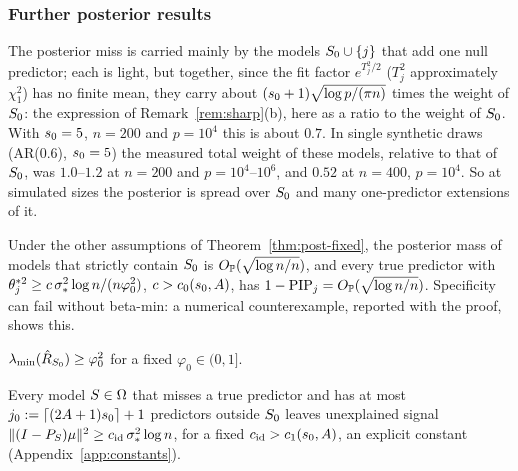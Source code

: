 \subsubsection{Further posterior results}

\begin{remark}\label{rem:moderate-n}
The posterior miss is carried mainly by the models
$S_0\cup\{j\}$ that add one null predictor; each is light, but together, since the fit factor $e^{T_j^2/2}$ ($T_j^2$
approximately $\chi^2_1$) has no finite mean, they carry about $(s_0+1)\sqrt{\log p/(\pi n)}$ times the weight of $S_0$:
the expression of Remark~\ref{rem:sharp}(b), here as a ratio to the weight of $S_0$. With $s_0=5$, $n=200$ and $p=10^4$ this is about $0.7$. In single
synthetic draws (AR(0.6), $s_0=5$) the measured total weight of these models, relative to that of $S_0$, was $1.0$--$1.2$
at $n=200$ and $p=10^4$--$10^6$, and $0.52$ at $n=400$, $p=10^4$. So at simulated sizes the posterior is spread over $S_0$
and many one-predictor extensions of it.
\end{remark}


\begin{remark}\label{rem:no-betamin}
Under the other assumptions of Theorem~\ref{thm:post-fixed}, the posterior mass of models that strictly contain $S_0$ is
$O_{\mathbb{P}}(\sqrt{\log n/n})$, and every true predictor with $\theta_j^{*2}\ge c\,\sigma_*^2\log n/(n\varphi_0^2)$, $c>c_0(s_0,A)$, has
$1-\mathrm{PIP}_j=O_{\mathbb{P}}(\sqrt{\log n/n})$. Specificity can fail without beta-min: a numerical counterexample, reported with the proof, shows this.
\end{remark}



\begin{localassumption}\label{asm:margin}
\begin{asmitems}
  \item $\lambda_{\min}(\hat R_{S_0})\ge\varphi_0^2$ for a fixed $\varphi_0\in(0,1]$.
  \item Every model $S\in\Omega$ that misses a true predictor and has at most $j_0:=\lceil(2A+1)s_0\rceil+1$ predictors
    outside $S_0$ leaves unexplained signal $\lVert (I-P_S)\mu\rVert^2\ge c_{\mathrm{id}}\,\sigma_*^2\log n$, for a fixed
    $c_{\mathrm{id}}>c_1(s_0,A)$, an explicit constant (Appendix~\ref{app:constants}).
\end{asmitems}
\end{localassumption}

